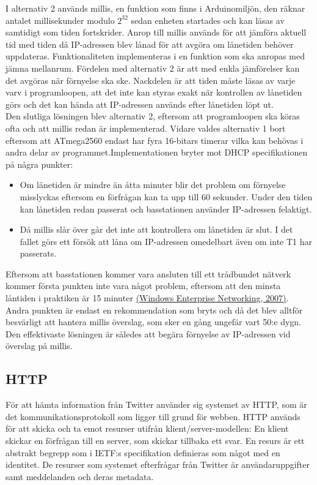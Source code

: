 \documentclass[a4paper,11pt]{article}
\begin{document}
I alternativ 2 används millis, en funktion som finns i Arduinomiljön, den räknar antalet millisekunder modulo $2^{32}$ sedan enheten startades och kan läsas av samtidigt som tiden fortskrider. Anrop till millis används för att jämföra aktuell tid med tiden då IP-adressen blev lånad för att avgöra om lånetiden behöver uppdateras. Funktionaliteten implementeras i en funktion som ska anropas med jämna mellanrum. Fördelen med alternativ 2 är att med enkla jämförelser kan det avgöras när förnyelse ska ske. Nackdelen är att tiden måste läsas av varje varv i programloopen, att det inte kan styras exakt när kontrollen av lånetiden görs och det kan hända att IP-adressen används efter lånetiden löpt ut.\\

Den slutliga lösningen blev alternativ 2, eftersom att programloopen ska köras ofta och att millis redan är implementerad. Vidare valdes alternativ 1 bort eftersom att ATmega2560 endast har fyra 16-bitars timerar vilka kan behövas i andra delar av programmet.Implementationen bryter mot DHCP specifikationen på några punkter:

	\begin{itemize}
	\item Om lånetiden är mindre än åtta minuter blir det problem om förnyelse misslyckas eftersom en förfrågan kan ta upp till 60 sekunder. Under den tiden kan lånetiden redan passerat och     basstationen använder IP-adressen felaktigt.
    	\item Då millis slår över går det inte att kontrollera om lånetiden är slut. I det fallet görs ett försök att låna om IP-adressen omedelbart även om inte T1 har passerats.
	\end{itemize}	

Eftersom att basstationen kommer vara ansluten till ett trådbundet nätverk kommer första punkten inte vara något problem, eftersom att den minsta låntiden i praktiken är 15 minuter \hyperref[wen]{(Windows Enterprise Networking, 2007)}. Andra punkten är endast en rekommendation som bryts och då det blev alltför besvärligt att hantera millis överslag, som sker en gång ungefär vart 50:e dygn. Den effektivaste lösningen är således att begära förnyelse av IP-adressen vid överslag på millis.
	
\subsection{HTTP}
För att hämta information från Twitter använder sig systemet av HTTP, som är det kommunikationsprotokoll som ligger till grund för webben. HTTP används för att skicka och ta emot resurser utifrån klient/server-modellen: En klient skickar en förfrågan till en server, som skickar tillbaka ett svar. En resurs är ett abstrakt begrepp som i IETF:s specifikation definieras som något med en identitet. De resurser som systemet efterfrågar från Twitter är användaruppgifter samt meddelanden och deras metadata. \\
\end{document}
